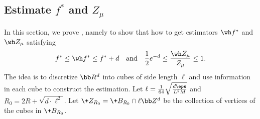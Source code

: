 

\subsection{Estimate $f^*$ and $Z_\mu$}\label{sec:estimate-of-pi}

In this section, we prove , namely to show that how to get estimators $\wh f^*$ and $\wh Z_{\mu}$ satisfying
\[
    f^* \leq \wh f^* \leq f^* + d \quad \mbox{and}\quad 
    \frac12 e^{-d}\le \frac{\wh Z_{\mu}}{Z_{\mu}} \le 1.
\]
The idea is to discretize $\bb R^d$ into cubes of side length $\ell$ and use information in each cube to construct the estimation. Let $\ell = \frac{1}{64}\sqrt{\frac{d\eps}{L^2 M}}$ and $R_0 = 2R + \sqrt{d \cdot \ell^2} $. Let $\+Z_{R_0} = \+B_{R_0}\cap \ell \bb Z^d$ be the collection of vertices of the cubes in $\+B_{R_0}$.

